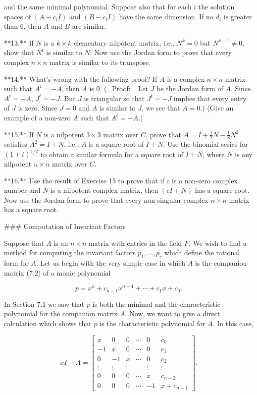 and the same minimal polynomial. Suppose also that for each \(i\) the solution spaces of \((A-c_{i}I)\) and \((B-c_{i}I)\) have the same dimension. If no \(d_{i}\) is greater than \(6\), then \(A\) and \(B\) are similar.

**13.** If \(N\) is a \(k\times k\) elementary nilpotent matrix, i.e., \(N^{k}=0\) but \(N^{k-1}\neq 0\), show that \(N^{t}\) is similar to \(N\). Now use the Jordan form to prove that every complex \(n\times n\) matrix is similar to its transpose.

**14.** What's wrong with the following proof? If \(A\) is a complex \(n\times n\) matrix such that \(A^{t}=-A\), then \(A\) is \(0\). (_Proof:_ Let \(J\) be the Jordan form of \(A\). Since \(A^{t}=-A\), \(J^{t}=-J\). But \(J\) is triangular so that \(J^{t}=-J\) implies that every entry of \(J\) is zero. Since \(J=0\) and \(A\) is similar to \(J\), we see that \(A=0\).) (Give an example of a non-zero \(A\) such that \(A^{t}=-A\).)

**15.** If \(N\) is a nilpotent \(3\times 3\) matrix over \(C\), prove that \(A=I+\frac{1}{2}N-\frac{1}{8}N^{2}\) satisfies \(A^{2}=I+N\), i.e., \(A\) is a square root of \(I+N\). Use the binomial series for \((1+t)^{1/2}\) to obtain a similar formula for a square root of \(I+N\), where \(N\) is any nilpotent \(n\times n\) matrix over \(C\).

**16.** Use the result of Exercise 15 to prove that if \(c\) is a non-zero complex number and \(N\) is a nilpotent complex matrix, then \((cI+N)\) has a square root. Now use the Jordan form to prove that every non-singular complex \(n\times n\) matrix has a square root.

### Computation of Invariant Factors

Suppose that \(A\) is an \(n\times n\) matrix with entries in the field \(F\). We wish to find a method for computing the invariant factors \(p_{1},\ldots,p_{r}\) which define the rational form for \(A\). Let us begin with the very simple case in which \(A\) is the companion matrix (7.2) of a monic polynomial

\[p=x^{n}+c_{n\!-\!1}x^{n\!-\!1}+\cdots+c_{1}x+c_{0}.\]

In Section 7.1 we saw that \(p\) is both the minimal and the characteristic polynomial for the companion matrix \(A\). Now, we want to give a direct calculation which shows that \(p\) is the characteristic polynomial for \(A\). In this case,

\[xI-A=\!\left[\!\!\begin{array}{cccccc}x&0&0&\cdots&0&c_{0}\\ -1&x&0&\cdots&0&c_{1}\\ 0&-1&x&\cdots&0&c_{2}\\ \vdots&\vdots&\vdots&&\vdots&\vdots\\ 0&0&0&\cdots&x&c_{n\!-\!2}\\ 0&0&0&\cdots&-1&x+c_{n\!-\!1}\end{array}\!\!\right]\!\!.\]

